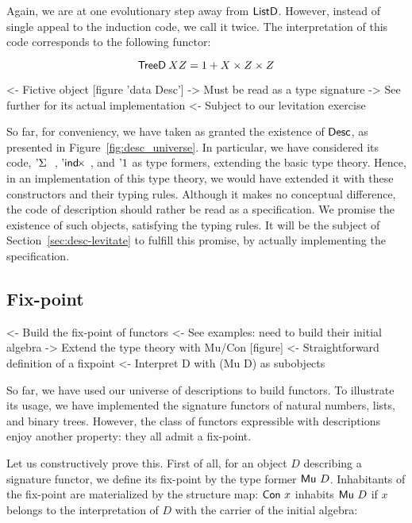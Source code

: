 Again, we are at one evolutionary step away from $\ListD$. However,
instead of single appeal to the induction code, we call it twice. The
interpretation of this code corresponds to the following functor:

\[    \TreeD\: X Z = 1 + X \times Z \times Z     \]

\begin{wstructure}
<- Fictive object [figure 'data Desc']
    -> Must be read as a type signature
    -> See further for its actual implementation
        <- Subject to our levitation exercise
\end{wstructure}

So far, for conveniency, we have taken as granted the existence of
$\Desc$, as presented in Figure~\ref{fig:desc_universe}. In
particular, we have considered its code, $\DSigma{}{}$, $\DIndx{}$,
and $\DUnit$ as type formers, extending the basic type theory. Hence,
in an implementation of this type theory, we would have extended it
with these constructors and their typing rules. Although it makes no
conceptual difference, the code of description should rather be read
as a specification. We promise the existence of such objects,
satisfying the typing rules. It will be the subject of
Section~\ref{sec:desc-levitate} to fulfill this promise, by actually
implementing the specification.

\subsection{Fix-point}

\begin{wstructure}
<- Build the fix-point of functors
    <- See examples: need to build their initial algebra
    -> Extend the type theory with Mu/Con [figure]
        <- Straightforward definition of a fixpoint
            <- Interpret D with (Mu D) as subobjects
\end{wstructure}


So far, we have used our universe of descriptions to build
functors. To illustrate its usage, we have implemented the signature
functors of natural numbers, lists, and binary trees. However, the
class of functors expressible with descriptions enjoy another
property: they all admit a fix-point.

Let us constructively prove this. First of all, for an object $D$
describing a signature functor, we define its fix-point by the type
former $\Mu{D}$. Inhabitants of the fix-point are materialized by the
structure map: $\Con{x}$ inhabits $\Mu{D}$ if $x$ belongs to the
interpretation of $D$ with the carrier of the initial algebra:

